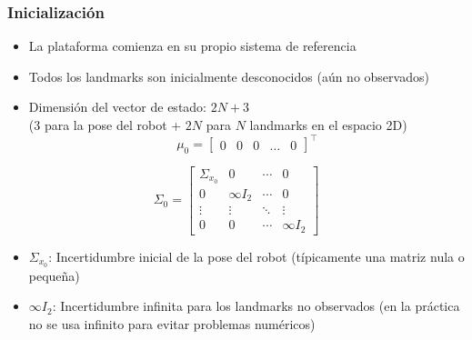 \begin{frame}
    \frametitle{Inicialización}

    \begin{itemize}
        \item La plataforma comienza en su propio sistema de referencia
        \item Todos los landmarks son inicialmente desconocidos (aún no observados)
        \item Dimensión del vector de estado: $2N + 3$ \\
        (3 para la pose del robot + $2N$ para $N$ landmarks en el espacio 2D)
        \begin{equation*}
            \mu_0 =
            \begin{bmatrix}
                0 & 0 & 0 & \dots & 0    
            \end{bmatrix}^{\top}
        \end{equation*}
    \end{itemize}
    
    \begin{equation*}
        \Sigma_0 =
        \begin{bmatrix}
            \Sigma_{x_0} & 0 & \cdots & 0 \\
            0 & \infty I_{2} & \cdots & 0 \\
            \vdots & \vdots & \ddots & \vdots \\
            0 & 0 & \cdots & \infty I_{2}
        \end{bmatrix}
    \end{equation*}
    
    \begin{itemize}
        \item $\Sigma_{x_0}$: Incertidumbre inicial de la pose del robot (típicamente una matriz nula o pequeña)
        \item $\infty I_{2}$: Incertidumbre infinita para los landmarks no observados (en la práctica no se usa infinito para evitar problemas numéricos)
    \end{itemize}


\end{frame}

